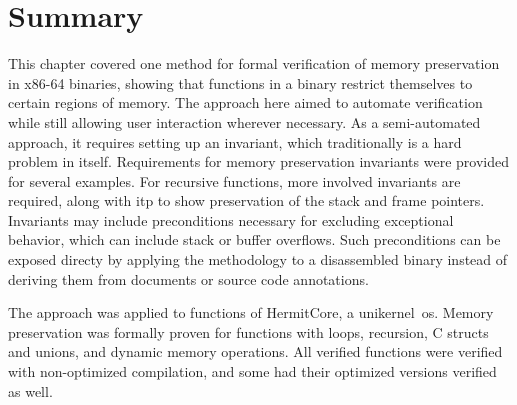 \section{Summary}
This chapter covered one method for formal verification
of memory preservation in x86-64 binaries,
showing that functions in a binary restrict themselves to certain regions of memory.
The approach here aimed to automate verification
while still allowing user interaction wherever necessary.
As a semi-automated approach,
it requires setting up an invariant, which traditionally is a hard problem in itself.
Requirements for memory preservation invariants were provided for several examples.
For recursive functions, more involved invariants are required,
along with \ac{itp} to show preservation of the stack and frame pointers.
Invariants may include preconditions necessary for excluding exceptional behavior,
which can include stack or buffer overflows.
Such preconditions can be exposed directy
by applying the methodology to a disassembled binary
instead of deriving them from documents or source code annotations.

The approach was applied to functions of HermitCore, a unikernel~\ac{os}.
Memory preservation was formally proven for functions with loops, recursion,
C structs and unions, and dynamic memory operations.
All verified functions were verified with non-optimized compilation,
and some had their optimized versions verified as well.
